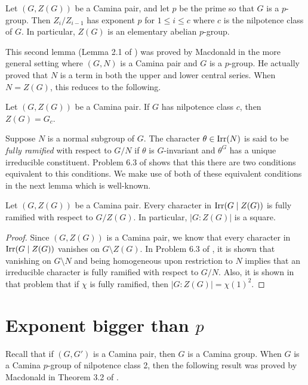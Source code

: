 \begin{lemma} \cite{MacD1} \label{exponent center}
Let $(G,Z(G))$ be a Camina pair, and let $p$ be the prime so that $G$ is a $p$-group.  Then $Z_i/Z_{i-1}$ has exponent $p$ for $1 \le i \le c$ where $c$ is the nilpotence class of $G$.  In particular, $Z(G)$ is an elementary abelian $p$-group.
\end{lemma}

This second lemma (Lemma 2.1 of \cite{MacD1}) was proved by Macdonald in the more general setting where $(G,N)$ is a Camina pair and $G$ is a $p$-group.  He actually proved that $N$ is a term in both the upper and lower central series.  When $N = Z(G)$, this reduces to the following.

\begin{lemma} \cite{MacD1}
Let $(G,Z(G))$ be a Camina pair.  If $G$ has nilpotence class $c$, then $Z(G) = G_c$.
\end{lemma}

Suppose $N$ is a normal subgroup of $G$.  The character $\theta \in {{\rm  Irr}(N)}$ is said to be {\it fully ramified} with respect to $G/N$ if $\theta$ is $G$-invariant and $\theta^G$ has a unique irreducible constituent.  Problem 6.3 of \cite{text} shows that this there are two conditions equivalent to this conditions.  We make use of both of these equivalent conditions in the next lemma which is well-known.

\begin{lemma}
Let $(G,Z(G))$ be a Camina pair.  Every character in ${{\rm  Irr}({G \mid Z(G)})}$ is fully ramified with respect to $G/Z(G)$.  In particular, $|G:Z(G)|$ is a square.
\end{lemma}

\begin{proof}
Since $(G,Z(G))$ is a Camina pair, we know that every character in ${{\rm  Irr}({G \mid Z(G)})}$ vanishes on $G \setminus Z(G)$.  In Problem 6.3 of \cite{text}, it is shown that vanishing on $G \setminus N$ and being homogeneous upon restriction to $N$ implies that an irreducible character is fully ramified with respect to $G/N$.  Also, it is shown in that problem that if $\chi$ is fully ramified, then $|G: Z(G)| = \chi (1)^2$.
\end{proof}

\section{Exponent bigger than $p$}

Recall that if $(G,G')$ is a Camina pair, then $G$ is a Camina group.  When $G$ is a Camina $p$-group of nilpotence class 2, then the following result was proved by Macdonald in Theorem 3.2 of \cite{MacD1}.

